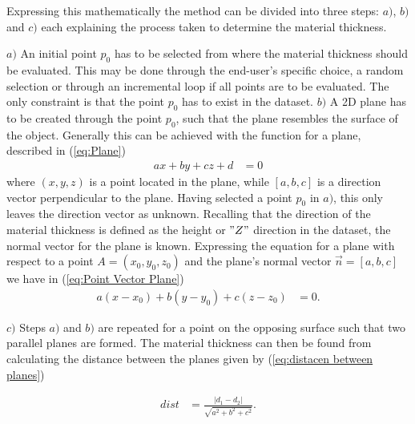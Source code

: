 \documentclass[%
]{USN-MSc}
\begin{document}
Expressing this mathematically the method can be divided into three steps: \(a)\), \(b)\) and \(c)\) each explaining the process taken to determine the material thickness. 

\(a)\) An initial point \(p_0\) has to be selected from where the material thickness should be evaluated. This may be done through the end-user's specific choice, a random selection or through an incremental loop if all points are to be evaluated. The only constraint is that the point \(p_0\) has to exist in the dataset.
\clearpage
\(b)\) A 2D plane has to be created through the point \(p_0\), such that the plane resembles the surface of the object. Generally this can be achieved with the function for a plane, described in (\ref{eq:Plane}) 
\begin{align}
    \label{eq:Plane}
    ax + by + cz + d &= 0 
\end{align}
where \((x, y, z)\) is a point located in the plane, while \([a, b, c]\) is a direction vector perpendicular to the plane. Having selected a point \(p_0\) in \(a)\), this only leaves the direction vector as unknown. Recalling that the direction of the material thickness is defined as the height or \("Z"\) direction in the dataset, the normal vector for the plane is known. Expressing the equation for a plane with respect to a point \(A=(x_0,y_0,z_0)\) and the plane's normal vector \(\vec{n}=[a,b,c]\) we have in (\ref{eq:Point Vector Plane})
\begin{align}
        \label{eq:Point Vector Plane}
    a(x-x_0) + b(y-y_0) + c(z-z_0) &= 0.
\end{align}


\(c)\) Steps \(a)\) and \(b)\) are repeated for a point on the opposing surface such that two parallel planes are formed. The material thickness can then be found from calculating the distance between the planes given by (\ref{eq:distacen between planes})


\begin{align}
\label{eq:distacen between planes}
dist &= \frac{|d_1-d_2|}{\sqrt{a^2+b^2+c^2}}. %
\end{align}
\end{document}
